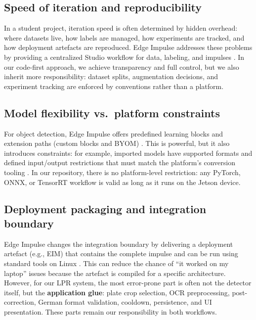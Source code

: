 \subsection{Speed of iteration and reproducibility}

\noindent
In a student project, iteration speed is often determined by hidden overhead:
where datasets live, how labels are managed, how experiments are tracked, and how deployment artefacts are reproduced.
Edge Impulse addresses these problems by providing a centralized Studio workflow for data, labeling, and impulses \cite{EdgeImpulseStudioOverview,EdgeImpulseImpulseDesign}.
In our code-first approach, we achieve transparency and full control, but we also inherit more responsibility:
dataset splits, augmentation decisions, and experiment tracking are enforced by conventions rather than a platform.

\subsection{Model flexibility vs.\ platform constraints}

\noindent
For object detection, Edge Impulse offers predefined learning blocks and extension paths (custom blocks and BYOM) \cite{EdgeImpulseLearningBlocks,EdgeImpulseBYOM}.
This is powerful, but it also introduces constraints:
for example, imported models have supported formats and defined input/output restrictions that must match the platform's conversion tooling \cite{EdgeImpulseBYOM}.
In our repository, there is no platform-level restriction:
any PyTorch, ONNX, or TensorRT workflow is valid as long as it runs on the Jetson device.

\subsection{Deployment packaging and integration boundary}

\noindent
Edge Impulse changes the integration boundary by delivering a deployment artefact (e.g., EIM) that contains the complete impulse and can be run using standard tools on Linux \cite{EdgeImpulseLinuxCLI,EdgeImpulseLinuxEIM}.
This can reduce the chance of ``it worked on my laptop'' issues because the artefact is compiled for a specific architecture.
However, for our LPR system, the most error-prone part is often not the detector itself, but the \textbf{application glue}:
plate crop selection, OCR preprocessing, post-correction, German format validation, cooldown, persistence, and UI presentation.
These parts remain our responsibility in both workflows.

